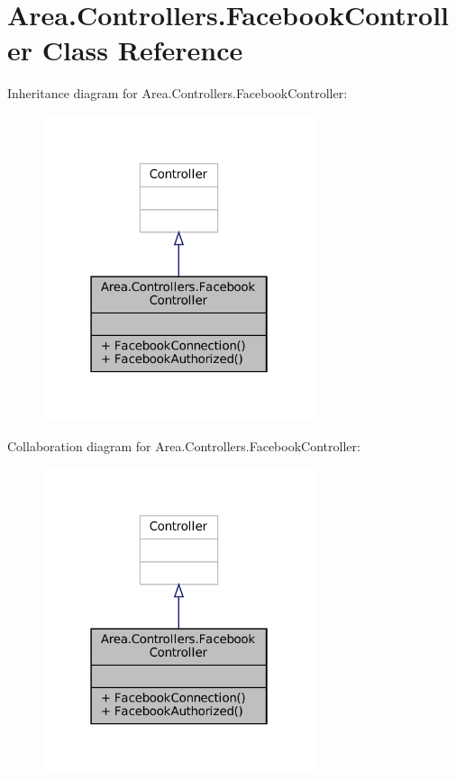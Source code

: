 \hypertarget{classArea_1_1Controllers_1_1FacebookController}{}\section{Area.\+Controllers.\+Facebook\+Controller Class Reference}
\label{classArea_1_1Controllers_1_1FacebookController}


Inheritance diagram for Area.\+Controllers.\+Facebook\+Controller\+:
\nopagebreak
\begin{figure}[H]
\begin{center}
\leavevmode
\includegraphics[width=226pt]{classArea_1_1Controllers_1_1FacebookController__inherit__graph}
\end{center}
\end{figure}


Collaboration diagram for Area.\+Controllers.\+Facebook\+Controller\+:
\nopagebreak
\begin{figure}[H]
\begin{center}
\leavevmode
\includegraphics[width=226pt]{classArea_1_1Controllers_1_1FacebookController__coll__graph}
\end{center}
\end{figure}
